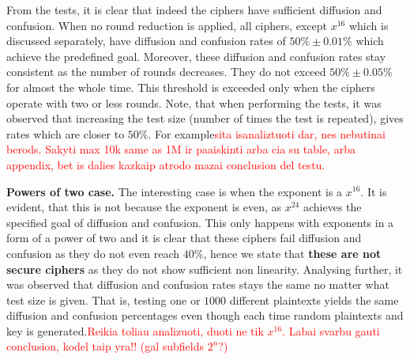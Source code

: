\documentclass{Resources/UoBLab1}
\theoremstyle{definition}
\begin{document}
%         
%         

From the tests, it is clear that indeed the ciphers have sufficient diffusion and confusion. When no round reduction is applied, all ciphers, except $x^{16}$ which is discussed separately, have diffusion and confusion rates of $50\% \pm 0.01\%$ which achieve the predefined goal. Moreover, these diffusion and confusion rates stay consistent as the number of rounds decreases. They do not exceed $50\% \pm 0.05\%$ for almost the whole time. This threshold is exceeded only when the ciphers operate with two or less rounds. Note, that when performing the tests, it was observed that increasing the test size (number of times the test is repeated), gives rates which are closer to $50\%$. For example\textcolor{red}{sita isanaliztuoti dar, nes nebutinai berods. Sakyti max 10k same as 1M ir paaiskinti arba cia su table, arba appendix, bet is dalies kazkaip atrodo mazai conclusion del testu.}\medskip

\noindent\textbf{Powers of two case.} The interesting case is when the exponent is a $x^{16}$. It is evident, that this is not because the exponent is even, as $x^{24}$ achieves the specified goal of diffusion and confusion. This only happens with exponents in a form of a power of two and it is clear that these ciphers fail diffusion and confusion as they do not even reach $40\%$, hence we state that \textbf{these are not secure ciphers} as they do not show sufficient non linearity. Analysing further, it was observed that diffusion and confusion rates stays the same no matter what test size is given. That is, testing one or $1000$ different plaintexts yields the same diffusion and confusion percentages even though each time random plaintexts and key is generated.\textcolor{red}{Reikia toliau analizuoti, duoti ne tik $x^{16}$. Labai svarbu gauti conclusion, kodel taip yra!! (gal subfields $2^n$?)}
\end{document}
